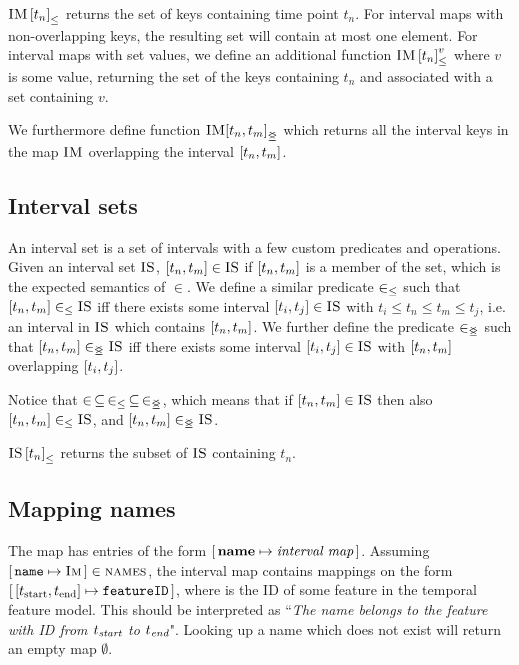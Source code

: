 ${\textsc{IM} \left[ t_n \right]}_{\leq}$ returns the set of keys containing time point $t_n$. For interval maps with non-overlapping keys, the resulting set will contain at most one element. For interval maps with set values, we define an additional function ${\textsc{IM} \left[ t_n \right]^{v}_{\leq}}$ where $v$ is some value, returning the set of the keys containing $t_n$ and associated with a set containing $v$. 

We furthermore define function $\overlapping{\map{IM}}{t_n}{t_m}$ which returns all the interval keys in the map $\textsc{IM}$ overlapping the interval $\interval{t_n}{t_m}$. 

\subsection{Interval sets}
\label{sub:interval-sets}
An interval set is a set of intervals with a few custom predicates and operations. Given an interval set $\textsc{IS}$, $\interval{t_n}{t_m} \in \map{IS}$ if $\interval{t_n}{t_m}$ is a member of the set, which is the expected semantics of $\in$. We define a similar predicate $\in_\leq$ such that $\interval{t_n}{t_m} \inn \map{IS}$ iff there exists some interval $\interval{t_i}{t_j} \in \map{IS}$ with $t_i \leq t_n \leq t_m \leq t_j$, i.e. an interval in $\textsc{IS}$ which contains $\interval{t_n}{t_m}$. We further define the predicate $\in_{\leq\!\!\!\!\geq}$ such that $\interval{t_n}{t_m} \innr \map{IS}$ iff there exists some interval $\interval{t_i}{t_j} \in \map{IS}$ with $\interval{t_n}{t_m}$ overlapping $\interval{t_i}{t_j}$. 

Notice that $\in \, \subseteq \, \in_\leq \, \subseteq \, \in_{\leq\!\!\!\!\geq}$, which means that if $\interval{t_n}{t_m} \in \map{IS}$ then also $\interval{t_n}{t_m} \inn \map{IS}$, and $\interval{t_n}{t_m} \innr \map{IS}$.

${\textsc{IS} \left[ t_n \right]}_{\leq}$ returns the subset of $\textsc{IS}$ containing $t_n$.

\subsection{Mapping names}
\label{sub:mapping-names}

The \names{} map has entries of the form $[ \,\textbf{name}{} \mapsto \textit{interval map}\, ]$. Assuming $[ \,\texttt{name} \mapsto \textsc{Im}\, ] \in \textsc{names}$, the interval map  contains mappings on the form $\intervalmapping{t_\text{start}}{t_\text{end}}{\var{featureID}}$, where  is the ID of some feature in the temporal feature model. This should be interpreted as ``\emph{The name \emph{} belongs to the feature with ID \emph{} from $t_{\emph{\text{start}}}$ to $t_{\emph{\text{end}}}$}". Looking up a name which does not exist will return an empty map $\emptyset$. 

